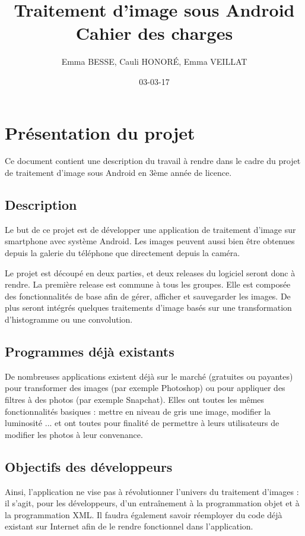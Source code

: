 \documentclass{article}
\title{{\bf Traitement d'image sous Android\\
Cahier des charges }}
\author{Emma BESSE, Cauli HONORÉ, Emma VEILLAT}
\date{03-03-17}
\begin{document}
\maketitle

\section{Présentation du projet}

Ce document contient une description du travail à rendre dans le cadre
du projet de traitement d'image sous Android en 3ème année de licence. 

\subsection{Description}

Le but de ce projet est de développer une application de traitement
d'image sur smartphone avec système Android. Les images peuvent aussi
bien être obtenues depuis la galerie du téléphone que directement
depuis la caméra. 

Le projet est découpé en deux parties, et deux releases du logiciel
seront donc à rendre. La première release est commune à tous les
groupes. Elle est composée des fonctionnalités de base afin de gérer,
afficher et sauvegarder les images. De plus seront intégrés quelques
traitements d'image basés sur une transformation d'histogramme ou une
convolution.

\subsection{Programmes déjà existants}

De nombreuses applications existent déjà sur le marché (gratuites
ou payantes) pour transformer des images (par exemple Photoshop)
ou pour appliquer des filtres à des photos (par exemple Snapchat).
Elles ont toutes les mêmes fonctionnalités basiques : mettre en niveau
de gris une image, modifier la luminosité ... et ont toutes pour
finalité de permettre à leurs utilisateurs de modifier les photos à leur
convenance.

\subsection{Objectifs des développeurs}

Ainsi, l'application ne vise pas à révolutionner l'univers du traitement
d'images : il s'agit, pour les développeurs, d'un entraînement à la
programmation objet et à la programmation XML. Il faudra également savoir
réemployer du code déjà existant sur Internet afin de le rendre fonctionnel
dans l'application.
\end{document}
